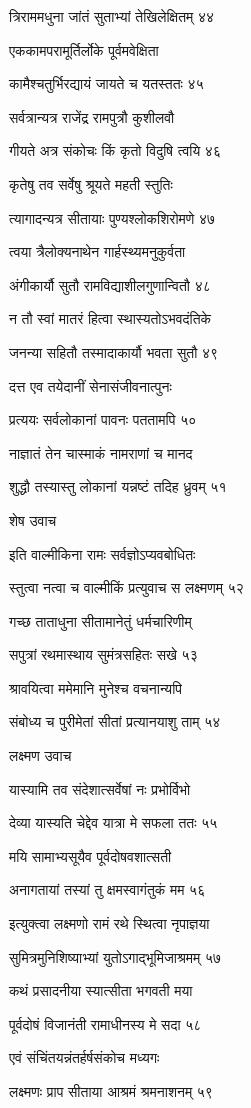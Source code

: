 त्रिराममधुना जांतं सुताभ्यां तेखिलेक्षितम् ४४

एककामपरामूर्तिर्लोके पूर्वमवेक्षिता

कामैश्चतुर्भिरद्यायं जायते च यतस्ततः ४५

सर्वत्रान्यत्र राजेंद्र रामपुत्रौ कुशीलवौ

गीयते अत्र संकोचः किं कृतो विदुषि त्वयि ४६

कृतेषु तव सर्वेषु श्रूयते महती स्तुतिः

त्यागादन्यत्र सीतायाः पुण्यश्लोकशिरोमणे ४७

त्वया त्रैलोक्यनाथेन गार्हस्थ्यमनुकुर्वता

अंगीकार्यौ सुतौ रामविद्याशीलगुणान्वितौ ४८

न तौ स्वां मातरं हित्वा स्थास्यतोऽभवदंतिके

जनन्या सहितौ तस्मादाकार्यौ भवता सुतौ ४९

दत्त एव तयेदानीं सेनासंजीवनात्पुनः

प्रत्ययः सर्वलोकानां पावनः पततामपि ५०

नाज्ञातं तेन चास्माकं नामराणां च मानद

शुद्धौ तस्यास्तु लोकानां यन्नष्टं तदिह ध्रुवम् ५१

शेष उवाच

इति वाल्मीकिना रामः सर्वज्ञोऽप्यवबोधितः

स्तुत्वा नत्वा च वाल्मीकिं प्रत्युवाच स लक्ष्मणम् ५२

गच्छ ताताधुना सीतामानेतुं धर्मचारिणीम्

सपुत्रां रथमास्थाय सुमंत्रसहितः सखे ५३

श्रावयित्वा ममेमानि मुनेश्च वचनान्यपि

संबोध्य च पुरीमेतां सीतां प्रत्यानयाशु ताम् ५४

लक्ष्मण उवाच

यास्यामि तव संदेशात्सर्वेषां नः प्रभोर्विभो

देव्या यास्यति चेद्देव यात्रा मे सफला ततः ५५

मयि सामाभ्यसूयैव पूर्वदोषवशात्सती

अनागतायां तस्यां तु क्षमस्वागंतुकं मम ५६

इत्युक्त्वा लक्ष्मणो रामं रथे स्थित्वा नृपाज्ञया

सुमित्रमुनिशिष्याभ्यां युतोऽगाद्भूमिजाश्रमम् ५७

कथं प्रसादनीया स्यात्सीता भगवती मया

पूर्वदोषं विजानंती रामाधीनस्य मे सदा ५८

एवं संचिंतयन्नंतर्हर्षसंकोच मध्यगः

लक्ष्मणः प्राप सीताया आश्रमं श्रमनाशनम् ५९

